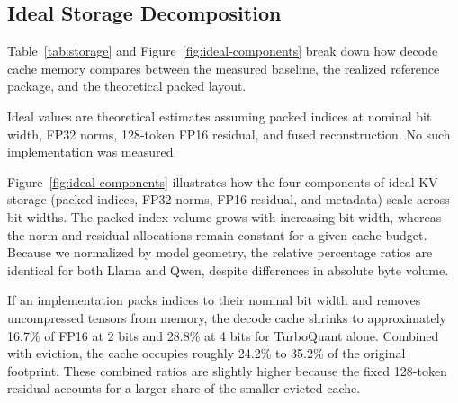 \documentclass[sigconf,nonacm]{acmart}
\begin{document}
\subsection{Ideal Storage Decomposition}

Table~\ref{tab:storage} and Figure~\ref{fig:ideal-components} break down how decode cache memory compares between the measured baseline, the realized reference package, and the theoretical packed layout.

\begin{table}[htbp]
\caption{Decode Storage at 4096 Tokens: Measured vs.\ Ideal (MiB)}
\label{tab:storage}
\centering\small
{}
\begin{minipage}{\columnwidth}\vspace{2pt}\footnotesize
Ideal values are theoretical estimates assuming packed indices at nominal bit
width, FP32 norms, 128-token FP16 residual, and fused reconstruction. No such
implementation was measured.
\end{minipage}
\end{table}

Figure~\ref{fig:ideal-components} illustrates how the four components of ideal KV storage (packed indices, FP32 norms, FP16 residual, and metadata) scale across bit widths. The packed index volume grows with increasing bit width, whereas the norm and residual allocations remain constant for a given cache budget. Because we normalized by model geometry, the relative percentage ratios are identical for both Llama and Qwen, despite differences in absolute byte volume.

If an implementation packs indices to their nominal bit width and removes uncompressed tensors from memory, the decode cache shrinks to approximately 16.7\% of FP16 at 2 bits and 28.8\% at 4 bits for TurboQuant alone. Combined with eviction, the cache occupies roughly 24.2\% to 35.2\% of the original footprint. These combined ratios are slightly higher because the fixed 128-token residual accounts for a larger share of the smaller evicted cache.
\end{document}
